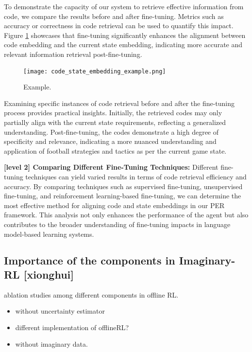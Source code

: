 To demonstrate the capacity of our system to retrieve effective information from code, we compare the results before and after fine-tuning. Metrics such as accuracy or correctness in code retrieval can be used to quantify this impact. Figure \ref{fig:code_state_embedding} showcases that fine-tuning significantly enhances the alignment between code embedding and the current state embedding, indicating more accurate and relevant information retrieval post-fine-tuning.

\begin{figure}[ht]
\centering
\texttt{[image: code\_state\_embedding\_example.png]}
\caption{Example.}
\label{fig:code_state_embedding}
\end{figure}

 Examining specific instances of code retrieval before and after the fine-tuning process provides practical insights. Initially, the retrieved codes may only partially align with the current state requirements, reflecting a generalized understanding. Post-fine-tuning, the codes demonstrate a high degree of specificity and relevance, indicating a more nuanced understanding and application of football strategies and tactics as per the current game state.
 
\textbf{[level 2] Comparing Different Fine-Tuning Techniques:} Different fine-tuning techniques can yield varied results in terms of code retrieval efficiency and accuracy. By comparing techniques such as supervised fine-tuning, unsupervised fine-tuning, and reinforcement learning-based fine-tuning, we can determine the most effective method for aligning code and state embeddings in our PER framework. This analysis not only enhances the performance of the agent but also contributes to the broader understanding of fine-tuning impacts in language model-based learning systems.


\subsection{Importance of the components in Imaginary-RL [xionghui]}

ablation studies among different components in offline RL.
\begin{itemize}
    \item without uncertainty estimator
    \item different implementation of offlineRL?
    \item without imaginary data.
\end{itemize}

